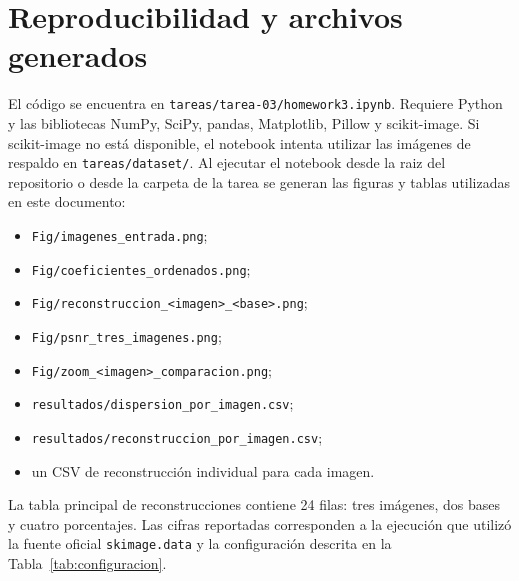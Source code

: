 \documentclass[11pt,a4paper]{article}
\begin{document}
\section{Reproducibilidad y archivos generados}

El c\'odigo se encuentra en \texttt{tareas/tarea-03/homework3.ipynb}. Requiere Python y las bibliotecas NumPy, SciPy, pandas, Matplotlib, Pillow y scikit-image. Si scikit-image no est\'a disponible, el notebook intenta utilizar las im\'agenes de respaldo en \texttt{tareas/dataset/}. Al ejecutar el notebook desde la raiz del repositorio o desde la carpeta de la tarea se generan las figuras y tablas utilizadas en este documento:
\begin{itemize}
    \item \texttt{Fig/imagenes\_entrada.png};
    \item \texttt{Fig/coeficientes\_ordenados.png};
    \item \texttt{Fig/reconstruccion\_<imagen>\_<base>.png};
    \item \texttt{Fig/psnr\_tres\_imagenes.png};
    \item \texttt{Fig/zoom\_<imagen>\_comparacion.png};
    \item \texttt{resultados/dispersion\_por\_imagen.csv};
    \item \texttt{resultados/reconstruccion\_por\_imagen.csv};
    \item un CSV de reconstrucción individual para cada imagen.
\end{itemize}
La tabla principal de reconstrucciones contiene 24 filas: tres imágenes, dos bases y cuatro porcentajes. Las cifras reportadas corresponden a la ejecución que utilizó la fuente oficial \texttt{skimage.data} y la configuración descrita en la Tabla~\ref{tab:configuracion}.
\end{document}
